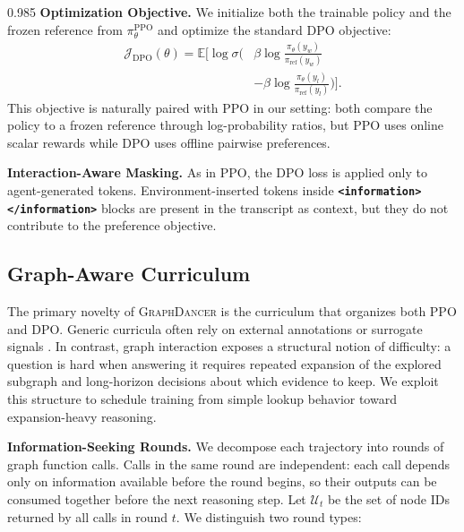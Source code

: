 \documentclass[11pt]{article}
\newcommand{\ours}{\textsc{GraphDancer}\xspace}
\begin{document}
\begin{spacing}{0.985}
\smallskip
\noindent\textbf{Optimization Objective.}
We initialize both the trainable policy and the frozen reference from $\pi^{\mathrm{PPO}}_\theta$ and optimize the standard DPO objective:
\begin{equation}
\begin{split}
\mathcal{J}_{\mathrm{DPO}}(\theta) = \mathbb{E}\bigg[\log \sigma\bigg( & \beta \log \tfrac{\pi_\theta(y_w)}{\pi_{\mathrm{ref}}(y_w)} \\
& - \beta \log \tfrac{\pi_\theta(y_l)}{\pi_{\mathrm{ref}}(y_l)} \bigg)\bigg].
\end{split}
\label{eq:dpo}
\end{equation}
This objective is naturally paired with PPO in our setting: both compare the policy to a frozen reference through log-probability ratios, but PPO uses online scalar rewards while DPO uses offline pairwise preferences.

\smallskip
\noindent\textbf{Interaction-Aware Masking.}
As in PPO, the DPO loss is applied only to agent-generated tokens.
Environment-inserted tokens inside \textbf{\texttt{<information>}} \textbf{\texttt{</information>}} blocks are present in the transcript as context, but they do not contribute to the preference objective.


\subsection{Graph-Aware Curriculum}
\label{sec:curriculum}

The primary novelty of \ours is the curriculum that organizes both PPO and DPO.
Generic curricula often rely on external annotations or surrogate signals \cite{qu2018curriculum,parashar2025curriculum}.
In contrast, graph interaction exposes a structural notion of difficulty: a question is hard when answering it requires repeated expansion of the explored subgraph and long-horizon decisions about which evidence to keep.
We exploit this structure to schedule training from simple lookup behavior toward expansion-heavy reasoning.

\smallskip
\noindent\textbf{Information-Seeking Rounds.}
\label{sec:round_types}
We decompose each trajectory into rounds of graph function calls.
Calls in the same round are independent: each call depends only on information available before the round begins, so their outputs can be consumed together before the next reasoning step.
Let $\mathcal{U}_t$ be the set of node IDs returned by all calls in round $t$.
We distinguish two round types:


\end{spacing}
\end{document}
